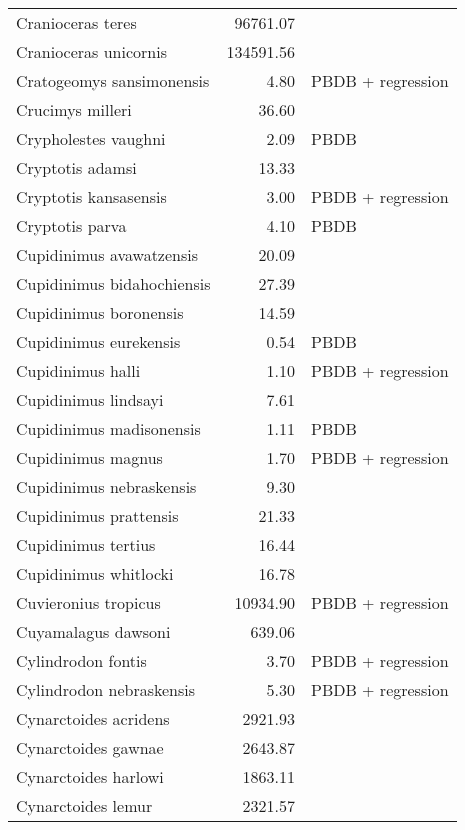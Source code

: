 \begin{table}[ht]
\begin{tabular}{lrl}
  Cranioceras teres & 96761.07 & \cite{Tomiya2013} \\ 
  Cranioceras unicornis & 134591.56 & \cite{Tomiya2013} \\ 
  Cratogeomys sansimonensis & 4.80 & PBDB + regression \\ 
  Crucimys milleri & 36.60 & \cite{Tomiya2013} \\ 
  Crypholestes vaughni & 2.09 & PBDB \\ 
  Cryptotis adamsi & 13.33 & \cite{Tomiya2013} \\ 
  Cryptotis kansasensis & 3.00 & PBDB + regression \\ 
  Cryptotis parva & 4.10 & PBDB \\ 
  Cupidinimus avawatzensis & 20.09 & \cite{Tomiya2013} \\ 
  Cupidinimus bidahochiensis & 27.39 & \cite{Tomiya2013} \\ 
  Cupidinimus boronensis & 14.59 & \cite{Tomiya2013} \\ 
  Cupidinimus eurekensis & 0.54 & PBDB \\ 
  Cupidinimus halli & 1.10 & PBDB + regression \\ 
  Cupidinimus lindsayi & 7.61 & \cite{Tomiya2013} \\ 
  Cupidinimus madisonensis & 1.11 & PBDB \\ 
  Cupidinimus magnus & 1.70 & PBDB + regression \\ 
  Cupidinimus nebraskensis & 9.30 & \cite{Tomiya2013} \\ 
  Cupidinimus prattensis & 21.33 & \cite{Tomiya2013} \\ 
  Cupidinimus tertius & 16.44 & \cite{Tomiya2013} \\ 
  Cupidinimus whitlocki & 16.78 & \cite{Tomiya2013} \\ 
  Cuvieronius tropicus & 10934.90 & PBDB + regression \\ 
  Cuyamalagus dawsoni & 639.06 & \cite{Tomiya2013} \\ 
  Cylindrodon fontis & 3.70 & PBDB + regression \\ 
  Cylindrodon nebraskensis & 5.30 & PBDB + regression \\ 
  Cynarctoides acridens & 2921.93 & \cite{Tomiya2013} \\ 
  Cynarctoides gawnae & 2643.87 & \cite{Tomiya2013} \\ 
  Cynarctoides harlowi & 1863.11 & \cite{Tomiya2013} \\ 
  Cynarctoides lemur & 2321.57 & \cite{Tomiya2013} \\ 

\end{tabular}
\end{table}
